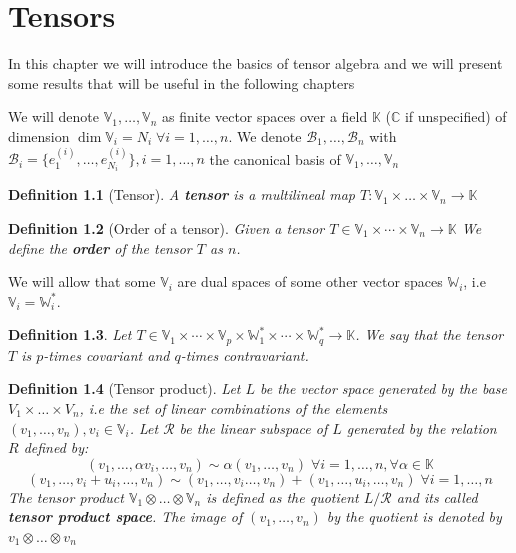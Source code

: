 \documentclass[11pt,a4paper,openright,oneside]{book}
\numberwithin{equation}{section}
\newtheorem{defn0}{Definition}[chapter]
\newenvironment{definition}{ \begin{defn0}}{\end{defn0}}
\begin{document}
\fi



\chapter{Tensors}

In this chapter we will introduce the basics of tensor algebra and we will present some results that will be useful in the
following chapters

We will denote $\mathbb{V}_1, \dots, \mathbb{V}_n$ as finite vector spaces over a field $\mathbb{K}$ ($\mathbb{C}$ if unspecified) of dimension $\dim{\mathbb{V}_i} = N_i \; \forall i = 1, \dots, n$.
We denote $\mathcal{B}_1, \dots, \mathcal{B}_n$ with ${\mathcal{B}_i = \{e_1^{(i)}, \dots, e_{N_i}^{(i)}\}, i = 1, \dots, n}$ the canonical basis of $\mathbb{V}_1, \dots, \mathbb{V}_n$

\begin{definition}[Tensor]
    A \textbf{tensor} is a multilineal map ${T: \mathbb{V}_1 \times \dots \times \mathbb{V}_n \rightarrow \mathbb{K}}$
\end{definition}

\begin{definition}[Order of a tensor] Given a tensor $T \in \mathbb{V}_1 \times \cdots \times \mathbb{V}_n \rightarrow \mathbb{K}$ We define the \textbf{order} of the tensor $T$ as $n$.
\end{definition}

We will allow that some $\mathbb{V}_i$ are dual spaces of some other vector spaces $\mathbb{W}_i$, i.e $\mathbb{V}_i = \mathbb{W}_i^*$.
\begin{definition}
    Let $T \in \mathbb{V}_1 \times \cdots \times \mathbb{V}_p \times \mathbb{W}_1^* \times \cdots \times \mathbb{W}_q^* \rightarrow \mathbb{K}$.
    We say that the tensor $T$ is $p$-times covariant and $q$-times contravariant.
\end{definition}

\begin{definition}[Tensor product] Let $L$ be the vector space generated by the base ${V_1 \times \dots \times V_n}$, i.e the
    set of linear combinations of the elements $(v_1, \dots, v_n), v_i \in \mathbb{V}_i$. Let $\mathcal{R}$ be the linear subspace of
    $L$ generated by the relation $R$ defined by:
    $$(v_1, \dots, \alpha v_i, \dots, v_n) \sim \alpha(v_1, \dots, v_n) \; \forall i = 1, \dots, n, \forall \alpha \in \mathbb{K}$$
    $$(v_1, \dots, v_i + u_i, \dots, v_n) \sim (v_1, \dots, v_i \dots, v_n) + (v_1, \dots, u_i, \dots, v_n) \; \forall i = 1, \dots, n$$
    The tensor product $\mathbb{V}_1 \otimes \dots \otimes \mathbb{V}_n$ is defined as the quotient $L / \mathcal{R}$ and its called 
    \textbf{tensor product space}. The image of
    $(v_1, \dots, v_n)$ by the quotient is denoted by $v_1 \otimes \dots \otimes v_n$
\end{definition}
\end{document}
